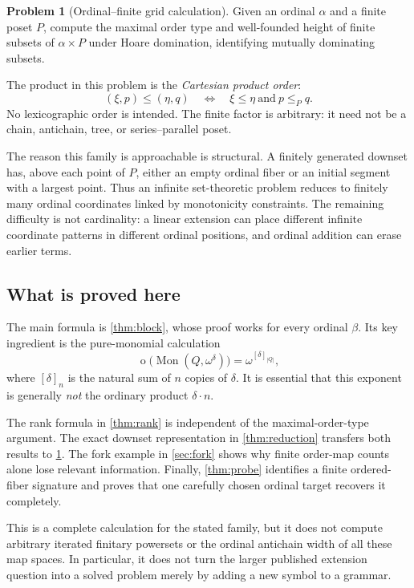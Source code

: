 \documentclass[11pt,a4paper]{article}
\theoremstyle{definition}
\newtheorem{problem}[problem]{Problem}
\theoremstyle{remark}
\newcommand{\Mon}{\operatorname{Mon}}
\newcommand{\otype}{\operatorname{o}}
\newcommand{\Nrep}[2]{\left[#1\right]_{#2}}
\begin{document}
\begin{problem}[Ordinal--finite grid calculation]\label{prob:grid}
Given an ordinal $\alpha$ and a finite poset $P$, compute the maximal order
type and well-founded height of finite subsets of $\alpha\times P$ under
Hoare domination, identifying mutually dominating subsets.
\end{problem}

The product in this problem is the \emph{Cartesian product order}:
\[
 (\xi,p)\leq(\eta,q)
 \quad\Longleftrightarrow\quad \xi\leq\eta\ \text{and}\ p\leq_Pq.
\]
No lexicographic order is intended. The finite factor is arbitrary: it need
not be a chain, antichain, tree, or series--parallel poset.

The reason this family is approachable is structural. A finitely generated
downset has, above each point of $P$, either an empty ordinal fiber or an
initial segment with a largest point. Thus an infinite set-theoretic problem
reduces to finitely many ordinal coordinates linked by monotonicity
constraints. The remaining difficulty is not cardinality: a linear extension
can place different infinite coordinate patterns in different ordinal
positions, and ordinal addition can erase earlier terms.

\subsection{What is proved here}
The main formula is \cref{thm:block}, whose proof works for every ordinal
$\beta$. Its key ingredient is the pure-monomial calculation
\[
 \otype\bigl(\Mon(Q,\omega^\delta)\bigr)
 =\omega^{\Nrep{\delta}{|Q|}},
\]
where $\Nrep{\delta}{n}$ is the natural sum of $n$ copies of $\delta$.
It is essential that this exponent is generally \emph{not} the ordinary
product $\delta\cdot n$.

The rank formula in \cref{thm:rank} is independent of the maximal-order-type
argument. The exact downset representation in \cref{thm:reduction} transfers
both results to \cref{prob:grid}. The fork example in \cref{sec:fork} shows
why finite order-map counts alone lose relevant information. Finally,
\cref{thm:probe} identifies a finite ordered-fiber signature and proves that
one carefully chosen ordinal target recovers it completely.

This is a complete calculation for the stated family, but it does not
compute arbitrary iterated finitary powersets or the ordinal antichain width
of all these map spaces. In particular, it does not turn the larger
published extension question into a solved problem merely by adding a new
symbol to a grammar.
\end{document}
